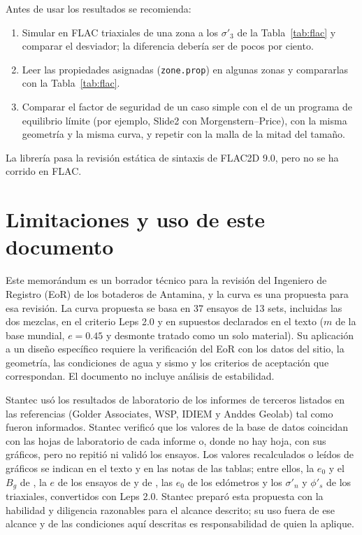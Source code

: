 \documentclass[11pt,letterpaper]{article}
\begin{document}
Antes de usar los resultados se recomienda:
\begin{enumerate}
\item Simular en FLAC triaxiales de una zona a los $\sigma'_3$ de la Tabla~\ref{tab:flac} y comparar el desviador; la diferencia debería ser de pocos por ciento.
\item Leer las propiedades asignadas (\texttt{zone.prop}) en algunas zonas y compararlas con la Tabla~\ref{tab:flac}.
\item Comparar el factor de seguridad de un caso simple con el de un programa de equilibrio límite (por ejemplo, Slide2 con Morgenstern--Price), con la misma geometría y la misma curva, y repetir con la malla de la mitad del tamaño.
\end{enumerate}
La librería pasa la revisión estática de sintaxis de FLAC2D 9.0, pero no se ha corrido en FLAC.

\section{Limitaciones y uso de este documento}\label{sec:uso}
Este memorándum es un borrador técnico para la revisión del Ingeniero de Registro (EoR) de los botaderos de Antamina, y la curva es una propuesta para esa revisión. La curva propuesta se basa en 37 ensayos de 13 sets, incluidas las dos mezclas, en el criterio Leps 2.0 y en supuestos declarados en el texto ($m$ de la base mundial, $e = 0.45$ y desmonte tratado como un solo material). Su aplicación a un diseño específico requiere la verificación del EoR con los datos del sitio, la geometría, las condiciones de agua y sismo y los criterios de aceptación que correspondan. El documento no incluye análisis de estabilidad.

Stantec usó los resultados de laboratorio de los informes de terceros listados en las referencias (Golder Associates, WSP, IDIEM y Anddes Geolab) tal como fueron informados. Stantec verificó que los valores de la base de datos coincidan con las hojas de laboratorio de cada informe o, donde no hay hoja, con sus gráficos, pero no repitió ni validó los ensayos. Los valores recalculados o leídos de gráficos se indican en el texto y en las notas de las tablas; entre ellos, la $e_0$ y el $B_g$ de \citet{g2012}, la $e$ de los ensayos de \citet{anddes2024} y de \citet{i2025}, las $e_0$ de los edómetros y los $\sigma'_n$ y $\phi'_s$ de los triaxiales, convertidos con Leps 2.0. Stantec preparó esta propuesta con la habilidad y diligencia razonables para el alcance descrito; su uso fuera de ese alcance y de las condiciones aquí descritas es responsabilidad de quien la aplique.
\end{document}
